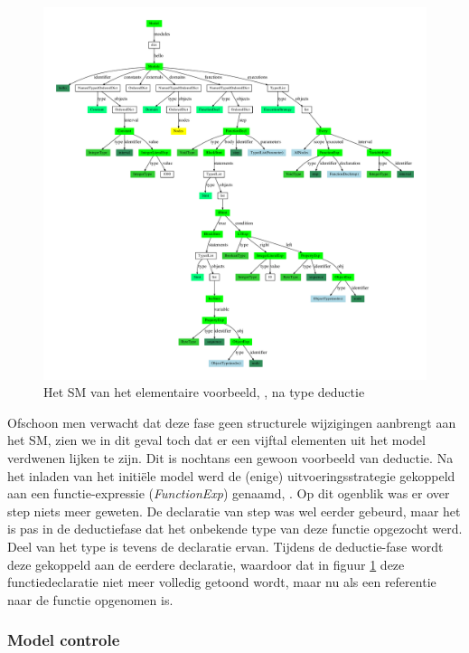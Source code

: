 \begin{figure}[ht]
  \centering
  \includegraphics[width=\linewidth]{resources/hello_sm_inferred.pdf}
  \caption{Het SM van het elementaire voorbeeld, , na type deductie}
  \label{fig:hello.sm-inferred}
\end{figure}

Ofschoon men verwacht dat deze fase geen structurele wijzigingen aanbrengt aan
het SM, zien we in dit geval toch dat er een vijftal elementen uit het model
verdwenen lijken te zijn. Dit is nochtans een gewoon voorbeeld van deductie. Na
het inladen van het initi\"ele model werd de (enige) uitvoeringsstrategie
gekoppeld aan een functie-expressie (\emph{FunctionExp}) genaamd, .
Op dit ogenblik was er over step niets meer geweten. De declaratie van step was
wel eerder gebeurd, maar het is pas in de deductiefase dat het onbekende type
van deze functie opgezocht werd. Deel van het type is tevens de declaratie
ervan. Tijdens de deductie-fase wordt deze gekoppeld aan de eerdere declaratie,
waardoor dat in figuur \ref{fig:hello.sm-inferred} deze functiedeclaratie niet
meer volledig getoond wordt, maar nu als een referentie naar de 
functie opgenomen is.

\subsubsection{Model controle}

